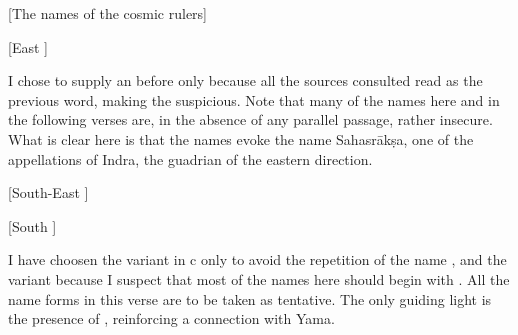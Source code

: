 \begin{center}
{{[The names of the cosmic rulers]}}
\end{center}



\begin{center}{{[East
]}}\end{center}




{ I chose to supply an  before  only because all the sources                  consulted read  as the previous word, making the                   suspicious.                  Note that many of the names here and in the following verses are,                 in the absence of any parallel passage, rather insecure.                 What is clear here is that the names evoke the name Sahasrākṣa,                 one of the appellations of                 Indra, the guadrian of the eastern direction. }




\begin{center}{{[South-East
]}}\end{center}













\begin{center}{{[South
]}}\end{center}




{ I have choosen the variant  in  c only to avoid the repetition of                         the name , and the variant  because I suspect that                         most of the names here should begin with . All the name forms                         in this verse are to be taken as tentative. The only                          guiding light is the presence of , reinforcing a connection with Yama. }




